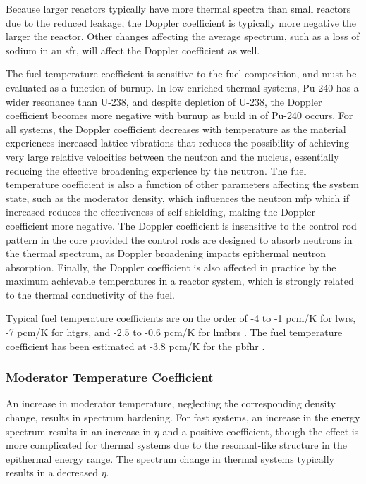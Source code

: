 Because larger reactors typically have more thermal spectra than small reactors due to the reduced leakage, the Doppler coefficient is typically more negative the larger the reactor. Other changes affecting the average spectrum, such as a loss of sodium in an \gls{sfr}, will affect the Doppler coefficient as well.

The fuel temperature coefficient is sensitive to the fuel composition, and must be evaluated as a function of burnup. In low-enriched thermal systems, Pu-240 has a wider resonance than U-238, and despite depletion of U-238, the Doppler coefficient becomes more negative with burnup as build in of Pu-240 occurs. For all systems, the Doppler coefficient decreases with temperature as the material experiences increased lattice vibrations that reduces the possibility of achieving very large relative velocities between the neutron and the nucleus, essentially reducing the effective broadening experience by the neutron. The fuel temperature coefficient is also a function of other parameters affecting the system state, such as the moderator density, which influences the neutron \gls{mfp} which if increased reduces the effectiveness of self-shielding, making the Doppler coefficient more negative. The Doppler coefficient is insensitive to the control rod pattern in the core provided the control rods are designed to absorb neutrons in the thermal spectrum, as Doppler broadening impacts epithermal neutron absorption. Finally, the Doppler coefficient is also affected in practice by the maximum achievable temperatures in a reactor system, which is strongly related to the thermal conductivity of the fuel.

Typical fuel temperature coefficients are on the order of -4 to -1 pcm/K for \glspl{lwr}, -7 pcm/K for \glspl{htgr}, and -2.5 to -0.6 pcm/K for \glspl{lmfbr} \cite{duderstadt}. The fuel temperature coefficient has been estimated at -3.8 pcm/K for the \gls{pbfhr} \cite{xin_wang_thesis}.

\subsubsection{Moderator Temperature Coefficient}
An increase in moderator temperature, neglecting the corresponding density change, results in spectrum hardening. For fast systems, an increase in the energy spectrum results in an increase in \(\eta\) and a positive coefficient, though the effect is more complicated for thermal systems due to the resonant-like structure in the epithermal energy range. The spectrum change in thermal systems typically results in a decreased \(\eta\).

